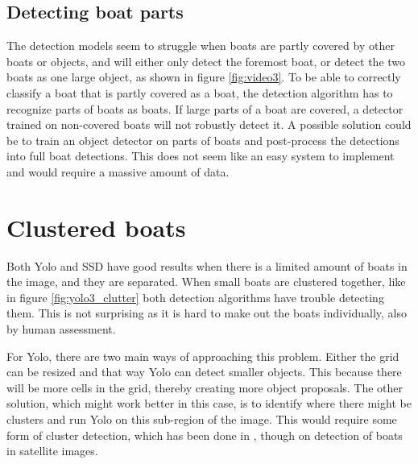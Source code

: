 \subsection{Detecting boat parts}
\label{sec:boat_parts}
The detection models seem to struggle when boats are partly covered by other boats or objects, and will either only detect the foremost boat, or detect the two boats as one large object, as shown in figure \ref{fig:video3}. To be able to correctly classify a boat that is partly covered as a boat, the detection algorithm has to recognize parts of boats as boats. If large parts of a boat are covered, a detector trained on non-covered boats will not robustly detect it. A possible solution could be to train an object detector on parts of boats and post-process the detections into full boat detections. This does not seem like an easy system to implement and would require a massive amount of data. 



\section{Clustered boats}
Both Yolo and SSD have good results when there is a limited amount of boats in the image, and they are separated. When small boats are clustered together, like in figure \ref{fig:yolo3_clutter} both detection algorithms have trouble detecting them. This is not surprising as it is hard to make out the boats individually, also by human assessment. 

\vspace{3mm}
\noindent
For Yolo, there are two main ways of approaching this problem. Either the grid can be resized and that way Yolo can detect smaller objects. This because there will be more cells in the grid, thereby creating more object proposals. The other solution, which might work better in this case, is to identify where there might be clusters and run Yolo on this sub-region of the image. This would require some form of cluster detection, which has been done in \citep{VanEtten}, though on detection of boats in satellite images. 

